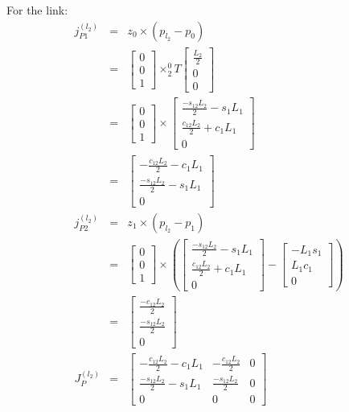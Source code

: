 \documentclass{article}
\begin{document}
For the link:
\begin{eqnarray*}
	j_{P1}^{(l_2)} &=& z_{0}\times\left(p_{l_2} - p_{0}  \right) \\
		       &=& \begin{bmatrix} 0 \\ 0 \\ 1 \end{bmatrix} \times ^0_2T \begin{bmatrix} \frac{L_2}{2} \\ 0 \\ 0 \end{bmatrix} \\
		       &=& \begin{bmatrix} 0 \\ 0 \\ 1 \end{bmatrix} \times \begin{bmatrix} \frac{-s_{12}L_2}{2}-s_1L_1 \\ \frac{c_{12}L_2}{2} + c_1L_1 \\ 0 \end{bmatrix} \\
		       &=& \begin{bmatrix} -\frac{c_{12}L_2}{2} - c_1L_1 \\ \frac{-s_{12}L_2}{2}-s_1L_1 \\ 0 \end{bmatrix} \\
	j_{P2}^{(l_2)} &=& z_{1} \times \left(p_{l_2} - p_{1} \right) \\
		       &=& \begin{bmatrix} 0 \\ 0 \\ 1 \end{bmatrix} \times \left( \begin{bmatrix} \frac{-s_{12}L_2}{2}-s_1L_1 \\ \frac{c_{12}L_2}{2} + c_1L_1 \\ 0 \end{bmatrix} - \begin{bmatrix} -L_1s_1 \\ L_1c_1 \\ 0 \end{bmatrix} \right) \\
		       &=& \begin{bmatrix} \frac{-c_{12}L_2}{2} \\ \frac{-s_{12}L_2}{2} \\ 0 \end{bmatrix} \\
	J_{P}^{(l_2)} &=& \begin{bmatrix} -\frac{c_{12}L_2}{2} - c_1L_1 & -\frac{c_{12}L_2}{2} & 0 \\ \frac{-s_{12}L_2}{2}-s_1L_1 & \frac{-s_{12}L_2}{2} & 0 \\ 0 & 0 & 0 \end{bmatrix}
\end{eqnarray*}
\end{document}
